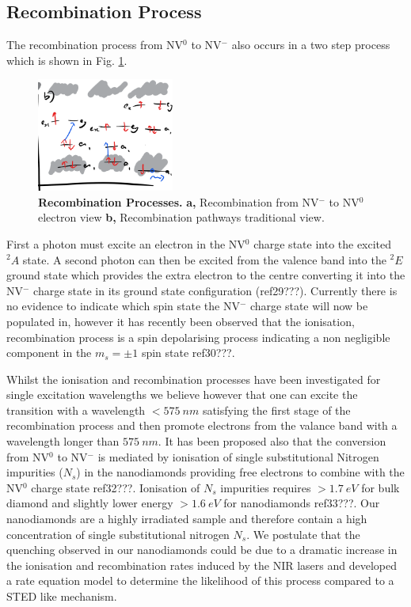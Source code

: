 \documentclass[,prl,twocolumn]{revtex4}
\begin{document}
\subsection{Recombination Process}
The recombination process from NV$^0$ to NV$^-$ also occurs in a two step process which is shown in Fig. \ref{FigChargeConversionb}.

\begin{figure}[H]
  \centering
  \includegraphics[width=0.4\textwidth]{ChargeConversionb.png} 
 \caption{\textbf{Recombination Processes.} \textbf{a,} Recombination from NV$^-$ to NV$^0$ electron view \textbf{b,} Recombination pathways traditional view.} \label{FigChargeConversionb}
\end{figure}

First a photon must excite an electron in the NV$^0$ charge state into the excited $^2A$ state. A second photon can then be excited from the valence band into the $^2E$ ground state which provides the extra electron to the centre converting it into the NV$^-$ charge state in its ground state configuration (ref29???). Currently there is no evidence to indicate which spin state the NV$^-$ charge state will now be populated in, however it has recently been observed that the ionisation, recombination process is a spin depolarising process indicating a non negligible component in the $m_s=\pm1$ spin state ref30???.

Whilst the ionisation and recombination processes have been investigated for single excitation wavelengths we believe however that one can excite the transition with a wavelength $<\SI{575}{nm}$ satisfying the first stage of the recombination process and then promote electrons from the valance band with a wavelength longer than $\SI{575}{nm}$. It has been proposed also that the conversion from NV$^0$ to NV$^-$ is mediated by ionisation of single substitutional Nitrogen impurities ($N_s$) in the nanodiamonds providing free electrons to combine with the NV$^0$ charge state ref32???. Ionisation of $N_s$ impurities requires $>\SI{1.7}{eV}$ for bulk diamond and slightly lower energy $>\SI{1.6}{eV}$ for nanodiamonds ref33???. Our nanodiamonds are a highly irradiated sample and therefore contain a high concentration of single substitutional nitrogen $N_s$. We postulate that the quenching observed in our nanodiamonds could be due to a dramatic increase in the ionisation and recombination rates induced by the NIR lasers and developed a rate equation model to determine the likelihood of this process compared to a STED like mechanism.
\end{document}
